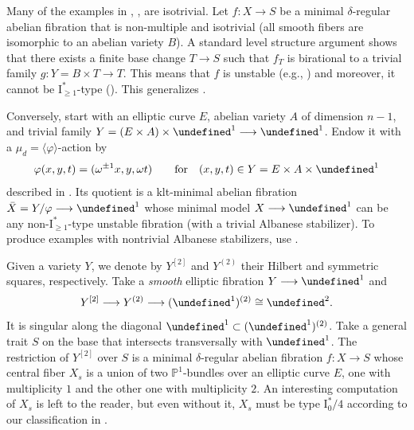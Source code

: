 \documentclass[reqno, letterpaper]{amsart}
\numberwithin{equation}{subsection}
\let\AA\undefined
\let\to\longrightarrow
\newcommand{\AA}{\mathbb{A}}
\newcommand{\PP}{\mathbb{P}}
\begin{document}
	\begin{example} 
		Many of the examples in \cite[\S 6]{mat01}, \cite[\S 6]{hwang-ogu11}, \cite{kim-laza-mar26} are isotrivial. Let $f : X \to S$ be a minimal $\delta$-regular abelian fibration that is non-multiple and isotrivial (all smooth fibers are isomorphic to an abelian variety $B$). A standard level structure argument shows that there exists a finite base change $T \to S$ such that $f_T$ is birational to a trivial family $g : Y = B \times T \to T$. This means that $f$ is unstable (e.g., ) and moreover, it cannot be $\mathrm I_{\ge 1}^*$-type (). This generalizes \cite[Proposition~4.20]{kim-laza-mar26}.
		
		Conversely, start with an elliptic curve $E$, abelian variety $A$ of dimension $n-1$, and trivial family $Y = (E \times A) \times \AA^1 \to \AA^1$. Endow it with a $\mu_d = \langle \varphi \rangle$-action by
		\[ \varphi (x,y,t) = (\omega^{\pm1} x, y, \omega t) \qquad\mbox{for}\quad (x,y,t) \in Y = E \times A \times \AA^1 \]
		described in . Its quotient is a klt-minimal abelian fibration $\bar X = Y/\varphi \to \AA^1$ whose minimal model $X \to \AA^1$ can be any non-$\mathrm I_{\ge 1}^*$-type unstable fibration (with a trivial Albanese stabilizer). To produce examples with nontrivial Albanese stabilizers, use .
	\end{example}
	
	\begin{example} 
		Given a variety $Y$, we denote by $Y^{[2]}$ and $Y^{(2)}$ their Hilbert and symmetric squares, respectively. Take a \emph{smooth} elliptic fibration $Y \to \AA^1$ and
		\[ Y^{[2]} \to Y^{(2)} \to (\AA^1)^{(2)} \cong \AA^2 .\]
		It is singular along the diagonal $\AA^1 \subset (\AA^1)^{(2)}$. Take a general trait $S$ on the base that intersects transversally with $\AA^1$. The restriction of $Y^{[2]}$ over $S$ is a minimal $\delta$-regular abelian fibration $f : X \to S$ whose central fiber $X_s$ is a union of two $\PP^1$-bundles over an elliptic curve $E$, one with multiplicity $1$ and the other one with multiplicity $2$. An interesting computation of $X_s$ is left to the reader, but even without it, $X_s$ must be type $\mathrm I_0^*/4$ according to our classification in .
	\end{example}
	
\end{document}
